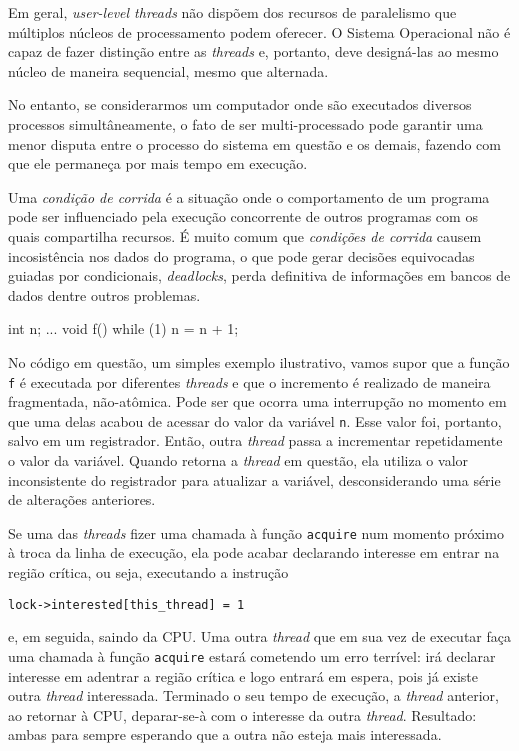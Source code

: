 \quest*{}%

\begin{answer}
    Em geral, \textit{user-level threads} não dispõem dos recursos de paralelismo que múltiplos núcleos de processamento podem oferecer. O Sistema Operacional não é capaz de fazer distinção entre as \textit{threads} e, portanto, deve designá-las ao mesmo núcleo de maneira sequencial, mesmo que alternada.
    
    No entanto, se considerarmos um computador onde são executados diversos processos simultâneamente, o fato de ser multi-processado pode garantir uma menor disputa entre o processo do sistema em questão e os demais, fazendo com que ele permaneça por mais tempo em execução. 
\end{answer}

\quest*{}%

\begin{answer}
    Uma \textit{condição de corrida} é a situação onde o comportamento de um programa pode ser influenciado pela execução concorrente de outros programas com os quais compartilha recursos. É muito comum que \textit{condições de corrida} causem incosistência nos dados do programa, o que pode gerar decisões equivocadas guiadas por condicionais, \textit{deadlocks}, perda definitiva de informações em bancos de dados dentre outros problemas.

    \begin{clang}
int n;
...
void f() {
    while (1) n = n + 1;
}
    \end{clang}
    No código em questão, um simples exemplo ilustrativo, vamos supor que a função \texttt{f} é executada por diferentes \textit{threads} e que o incremento é realizado de maneira fragmentada, não-atômica. Pode ser que ocorra uma interrupção no momento em que uma delas acabou de acessar do valor da variável \texttt{n}. Esse valor foi, portanto, salvo em um registrador. Então, outra \textit{thread} passa a incrementar repetidamente o valor da variável. Quando retorna a \textit{thread} em questão, ela utiliza o valor inconsistente do registrador para atualizar a variável, desconsiderando uma série de alterações anteriores.

\end{answer}

\quest*{}%

\begin{answer}
    Se uma das \textit{threads} fizer uma chamada à função \texttt{acquire} num momento próximo à troca da linha de execução, ela pode acabar declarando interesse em entrar na região crítica, ou seja, executando a instrução
    
    \texttt{lock->interested[this\_thread] = 1}

    e, em seguida, saindo da CPU. Uma outra \textit{thread} que em sua vez de executar faça uma chamada à função \texttt{acquire} estará cometendo um erro terrível: irá declarar interesse em adentrar a região crítica e logo entrará em espera, pois já existe outra \textit{thread} interessada. Terminado o seu tempo de execução, a \textit{thread} anterior, ao retornar à CPU, deparar-se-à com o interesse da outra \textit{thread}. Resultado: ambas para sempre esperando que a outra não esteja mais interessada.
\end{answer}